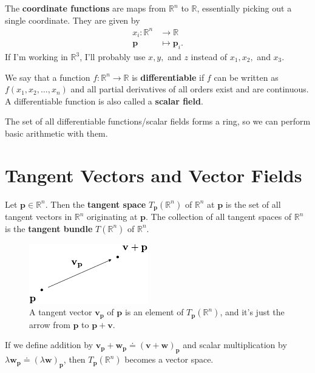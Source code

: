 \documentclass[10pt]{report}
\begin{document}
The \textbf{coordinate functions} are maps from $\mathbb{R}^n$ to $\mathbb{R}$, essentially picking out a single coordinate. They are given by
\begin{align*}
	x_i : \mathbb{R}^n &\to \mathbb{R} \\
	\mathbf{p}&\mapsto \mathbf{p}_i.
\end{align*}
If I'm working in $\mathbb{R}^3$, I'll probably use $x,y,$ and $z$ instead of $x_1, x_2,$ and $x_3$.

We say that a function $f:\mathbb{R}^n \to \mathbb{R}$ is \textbf{differentiable} if $f$ can be written as $f(x_1, x_2, \dots, x_n)$ and all partial derivatives of all orders exist and are continuous. A differentiable function is also called a \textbf{scalar field}.

The set of all differentiable functions/scalar fields forms a ring, so we can perform basic arithmetic with them.



\section{Tangent Vectors and Vector Fields}

\begin{defn}
	Let $\mathbf{p} \in \mathbb{R}^n$. Then the \textbf{tangent space} $T_\mathbf{p}(\mathbb{R}^n)$ of $\mathbb{R}^n$ at $\mathbf{p}$ is the set of all tangent vectors in $\mathbb{R}^n$ originating at $\mathbf{p}$. The collection of all tangent spaces of $\mathbb{R}^n$ is the \textbf{tangent bundle} $T(\mathbb{R}^n)$ of $\mathbb{R}^n$.
\end{defn}

\begin{figure}[H]
	\centering
	\includegraphics[scale=1]{fig/tan-vec.pdf}
	\caption{A tangent vector $\mathbf{v}_{\mathbf{p}}$ of $\mathbf{p}$ is an element of $T_{\mathbf{p}}(\mathbb{R}^n)$, and it's just the arrow from $\mathbf{p}$ to $\mathbf{p}+\mathbf{v}$.}
\end{figure}

If we define addition by $\mathbf{v}_{\mathbf{p}}+\mathbf{w}_{\mathbf{p}} \doteq (\mathbf{v}+\mathbf{w})_\mathbf{p}$ and scalar multiplication by $\lambda \mathbf{w}_\mathbf{p} \doteq (\lambda \mathbf{w})_\mathbf{p}$, then $T_\mathbf{p}(\mathbb{R}^n)$ becomes a vector space.
\end{document}

